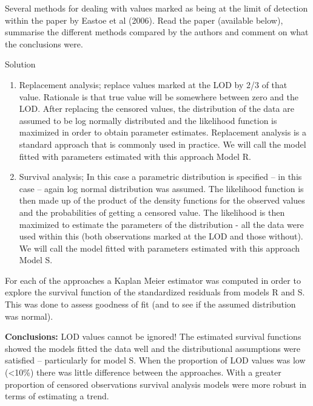 \documentclass[
  letterpaper,
  DIV=11,
  numbers=noendperiod,
  oneside]{scrartcl}
\begin{document}
\begin{tcolorbox}[enhanced jigsaw, bottomrule=.15mm, breakable, bottomtitle=1mm, colback=white, titlerule=0mm, colbacktitle=quarto-callout-tip-color!10!white, rightrule=.15mm, toptitle=1mm, left=2mm, opacityback=0, toprule=.15mm, arc=.35mm, title={Task 4}, colframe=quarto-callout-tip-color-frame, coltitle=black, leftrule=.75mm, opacitybacktitle=0.6]

Several methods for dealing with values marked as being at the limit of
detection within the paper by Eastoe et al (2006). Read the paper
(available below), summarise the different methods compared by the
authors and comment on what the conclusions were.

Solution

\begin{enumerate}
\def\labelenumi{(\alph{enumi})}
\item
  Replacement analysis; replace values marked at the LOD by 2/3 of that
  value. Rationale is that true value will be somewhere between zero and
  the LOD. After replacing the censored values, the distribution of the
  data are assumed to be log normally distributed and the likelihood
  function is maximized in order to obtain parameter estimates.
  Replacement analysis is a standard approach that is commonly used in
  practice. We will call the model fitted with parameters estimated with
  this approach Model R.
\item
  Survival analysis; In this case a parametric distribution is specified
  -- in this case -- again log normal distribution was assumed. The
  likelihood function is then made up of the product of the density
  functions for the observed values and the probabilities of getting a
  censored value. The likelihood is then maximized to estimate the
  parameters of the distribution - all the data were used within this
  (both observations marked at the LOD and those without). We will call
  the model fitted with parameters estimated with this approach Model S.
\end{enumerate}

For each of the approaches a Kaplan Meier estimator was computed in
order to explore the survival function of the standardized residuals
from models R and S. This was done to assess goodness of fit (and to see
if the assumed distribution was normal).

\textbf{Conclusions:} LOD values cannot be ignored! The estimated
survival functions showed the models fitted the data well and the
distributional assumptions were satisfied -- particularly for model S.
When the proportion of LOD values was low (\textless10\%) there was
little difference between the approaches. With a greater proportion of
censored observations survival analysis models were more robust in terms
of estimating a trend.

\end{tcolorbox}
\end{document}
